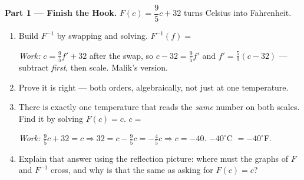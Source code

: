 \documentclass[10pt]{article}
\begin{document}
\begin{tcolorbox}[colback=white, colframe=black!40, title=\textbf{Tier E --- Extension},
    fonttitle=\bfseries, arc=1.5mm, left=3mm, right=3mm, top=2mm, bottom=2mm, breakable]
\textbf{Part 1 --- Finish the Hook.} $F(c)=\dfrac{9}{5}c+32$ turns Celsius into Fahrenheit.
\begin{enumerate}[label=(\alph*), leftmargin=1.9em, itemsep=6pt]
  \item Build $F^{-1}$ by swapping and solving. \; $F^{-1}(f)=$ 

        {\small \emph{Work:} $c=\frac95 f'+32$ after the swap, so $c-32=\frac95 f'$ and
        $f'=\frac59(c-32)$ --- subtract \emph{first}, then scale. Malik's version.}
  \item Prove it is right --- both orders, algebraically, not just at one temperature.
  \item There is exactly one temperature that reads the \emph{same} number on both scales. Find it
        by solving $F(c)=c$. \; $c=$ 

        {\small \emph{Work:} $\frac95 c+32=c \Rightarrow 32=c-\frac95 c=-\frac45 c \Rightarrow
        c=-40$. \; $-40^\circ$C $=-40^\circ$F.}
  \item Explain that answer using the reflection picture: where must the graphs of $F$ and $F^{-1}$
        cross, and why is that the same as asking for $F(c)=c$? 
\end{enumerate}


\end{tcolorbox}
\end{document}
